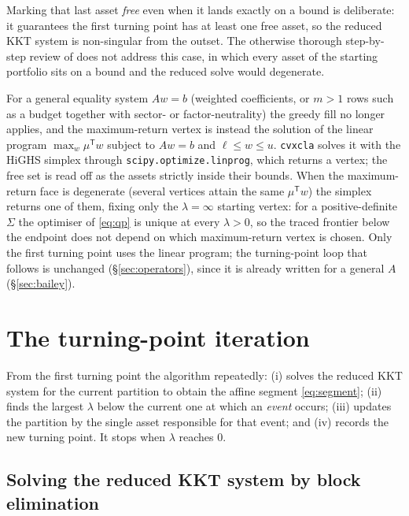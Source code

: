 \documentclass[11pt]{article}
\newcommand{\Sig}{\Sigma}
\newcommand{\lb}{\ell}              %
\newcommand{\ub}{u}                 %
\newcommand{\trans}{^{\mathsf{T}}}
\begin{document}
Marking that last asset \emph{free} even when it lands exactly on a bound is
deliberate: it guarantees the first turning point has at least one free asset, so the
reduced KKT system is non-singular from the outset. The otherwise thorough
step-by-step review of \citet{markowitz2021} does not address this case, in which
every asset of the starting portfolio sits on a bound and the reduced solve would
degenerate.

For a general equality system $A w = b$ (weighted coefficients, or $m > 1$ rows such
as a budget together with sector- or factor-neutrality) the greedy fill no longer
applies, and the maximum-return vertex is instead the solution of the linear program
$\max_w \mu\trans w$ subject to $A w = b$ and $\lb \le w \le \ub$. \texttt{cvxcla}
solves it with the HiGHS simplex through \texttt{scipy.optimize.linprog}, which returns
a vertex; the free set is read off as the assets strictly inside their bounds. When the
maximum-return face is degenerate (several vertices attain the same $\mu\trans w$) the
simplex returns one of them, fixing only the $\lambda=\infty$ starting vertex: for a
positive-definite $\Sig$ the optimiser of \eqref{eq:qp} is unique at every $\lambda>0$,
so the traced frontier below the endpoint does not depend on which maximum-return vertex
is chosen. Only the
first turning point uses the linear program; the turning-point loop that follows is
unchanged (\S\ref{sec:operators}), since it is already written for a general $A$
(\S\ref{sec:bailey}).

\section{The turning-point iteration}

From the first turning point the algorithm repeatedly: (i) solves the reduced KKT
system for the current partition to obtain the affine segment \eqref{eq:segment};
(ii) finds the largest $\lambda$ below the current one at which an \emph{event}
occurs; (iii) updates the partition by the single asset responsible for that event;
and (iv) records the new turning point. It stops when $\lambda$ reaches $0$.

\subsection{Solving the reduced KKT system by block elimination}
\label{sec:blockelim}
\end{document}
